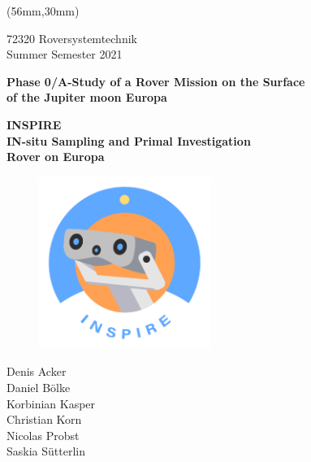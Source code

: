 %
%

\begin{titlepage}
	
	\begin{textblock*}{117mm}(56mm,30mm)
		
		\begin{center}
		
		
			72320 Roversystemtechnik \\
			Summer Semester 2021
			
			\vspace{10mm}
			
			\large \textbf{Phase 0/A-Study of a Rover Mission on the Surface \\ of the Jupiter moon Europa}
			
			\vspace{10mm}
			
			\large \textbf{INSPIRE} \\ 
			\vspace{5mm}
			\large \textbf{IN-situ Sampling and Primal Investigation \\ Rover on Europa}
			
			\vspace{10mm}
			
			\begin{figure}[htb]
    		\centering
     		\includegraphics[width=0.5\textwidth]{Media/Logo}
			\end{figure}
			
			\vspace{10mm}
			
			
			\vspace{10mm}
			
			
			\normalsize 
			Denis Acker \\
			Daniel Bölke \\
			Korbinian Kasper \\
			Christian Korn \\
			Nicolas Probst \\
			Saskia Sütterlin \\
			

\end{center}
\end{textblock*}
\end{titlepage}

